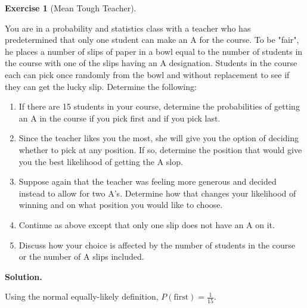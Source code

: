 \documentclass[10pt,]{book}
\theoremstyle{plain}
\theoremstyle{definition}
\theoremstyle{definition}
\theoremstyle{definition}
\newtheorem{exercise}[theorem]{Exercise}
\numberwithin{equation}{section}
\begin{document}
\begin{exercise}[{Mean Tough Teacher}]\label{exercise-25}

	You are in a probability and statistics class with a teacher who has predetermined that only one student can make an A for the course. To be "fair", he places a number of slips of paper in a bowl equal to the number of students in the course with one of the slips having an A designation. Students in the course each can pick once randomly from the bowl and without replacement to see if they can get the lucky slip.  Determine the following:
	\leavevmode%
\begin{enumerate}
\item\hypertarget{li-148}{}If there are 15 students in your course, determine the probabilities of getting an A in the course if you pick first and if you pick last.%
\item\hypertarget{li-149}{}Since the teacher likes you the most, she will give you the option of deciding whether to pick at any position. If so, determine the position that would give you the best likelihood of getting the A slop.%
\item\hypertarget{li-150}{}Suppose again that the teacher was feeling more generous and decided instead to allow for two A's. Determine how that changes your likelihood of winning and on what position you would like to choose.%
\item\hypertarget{li-151}{}Continue as above except that only one slip does not have an A on it.%
\item\hypertarget{li-152}{}Discuss how your choice is affected by the number of students in the course or the number of A slips included.%
\end{enumerate}

\par\smallskip
\noindent\textbf{Solution.}\hypertarget{solution-4}{}\quad

	Using the normal equally-likely definition, \(P(\text{first}) = \frac{1}{15}\).
\par


\end{exercise}
\end{document}
